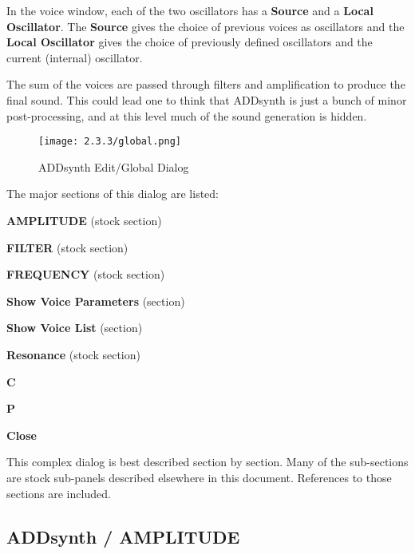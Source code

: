    In the voice window, each of the two oscillators has a \textbf{Source} and a
   \textbf{Local Oscillator}. The \textbf{Source} gives the choice of previous
   voices as oscillators and the \textbf{Local Oscillator} gives the choice
   of previously defined oscillators and the current (internal) oscillator.

   The sum of the voices are passed through filters and amplification to
   produce the final sound. This could lead one to think that ADDsynth is just
   a bunch of minor post-processing, and at this level much of the sound
   generation is hidden.

\begin{figure}[H]
   \centering
   \texttt{[image: 2.3.3/global.png]}
   \caption{ADDsynth Edit/Global Dialog}
   \label{fig:addsynth_edit_dialog}
\end{figure}

   The major sections of this dialog are listed:

   \begin{enumber}
      \item \textbf{AMPLITUDE} (stock section)
      \item \textbf{FILTER} (stock section)
      \item \textbf{FREQUENCY} (stock section)
      \item \textbf{Show Voice Parameters} (section)
      \item \textbf{Show Voice List} (section)
      \item \textbf{Resonance} (stock section)
      \item \textbf{C}
      \item \textbf{P}
      \item \textbf{Close}
   \end{enumber}

   This complex dialog is best described section by section.
   Many of the sub-sections are stock sub-panels described elsewhere
   in this document.  References to those sections are included.

\subsection{ADDsynth / AMPLITUDE}
\label{subsec:addsynth_amplitude}

